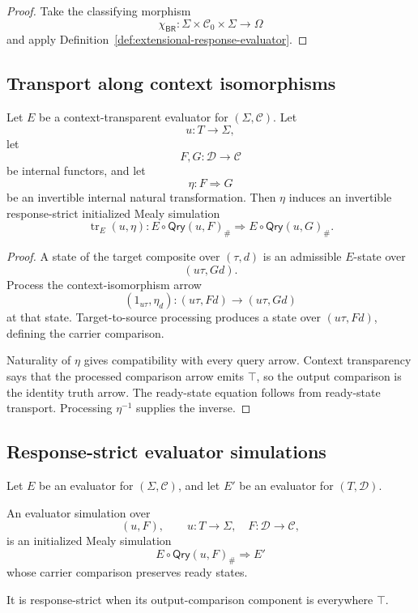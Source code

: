 \begin{proof}
Take the classifying morphism
\[
  \chi_{\mathsf{BR}}:
  \Sigma\times\mathcal C_0\times\Sigma
  \to\Omega
\]
and apply Definition~\ref{def:extensional-response-evaluator}.
\end{proof}

\subsection{Transport along context isomorphisms}

\begin{lemma}
\label{lem:evaluator-transport}
Let \(E\) be a context-transparent evaluator for \((\Sigma,\mathcal C)\). Let
\[
  u:T\to\Sigma,
\]
let
\[
  F,G:\mathcal D\to\mathcal C
\]
be internal functors, and let
\[
  \eta:F\Longrightarrow G
\]
be an invertible internal natural transformation. Then \(\eta\) induces an invertible
response-strict initialized Mealy simulation
\[
  \operatorname{tr}_E(u,\eta):
  E\circ\mathsf{Qry}(u,F)_\#
  \Longrightarrow
  E\circ\mathsf{Qry}(u,G)_\#.
\]
\end{lemma}

\begin{proof}
A state of the target composite over \((\tau,d)\) is an admissible \(E\)-state over
\[
  (u\tau,Gd).
\]
Process the context-isomorphism arrow
\[
  (1_{u\tau},\eta_d):
  (u\tau,Fd)\longrightarrow(u\tau,Gd)
\]
at that state. Target-to-source processing produces a state over \((u\tau,Fd)\), defining the
carrier comparison.

Naturality of \(\eta\) gives compatibility with every query arrow. Context transparency says that
the processed comparison arrow emits \(\top\), so the output comparison is the identity truth
arrow. The ready-state equation follows from ready-state transport. Processing
\(\eta^{-1}\) supplies the inverse.
\end{proof}

\subsection{Response-strict evaluator simulations}

\begin{definition}
\label{def:evaluator-simulation-over-reindexing}
Let \(E\) be an evaluator for \((\Sigma,\mathcal C)\), and let \(E'\) be an evaluator for
\((T,\mathcal D)\).

An evaluator simulation over
\[
  (u,F),
  \qquad
  u:T\to\Sigma,
  \quad
  F:\mathcal D\to\mathcal C,
\]
is an initialized Mealy simulation
\[
  E\circ\mathsf{Qry}(u,F)_\#
  \Longrightarrow
  E'
\]
whose carrier comparison preserves ready states.

It is response-strict when its output-comparison component is everywhere \(\top\).
\end{definition}

